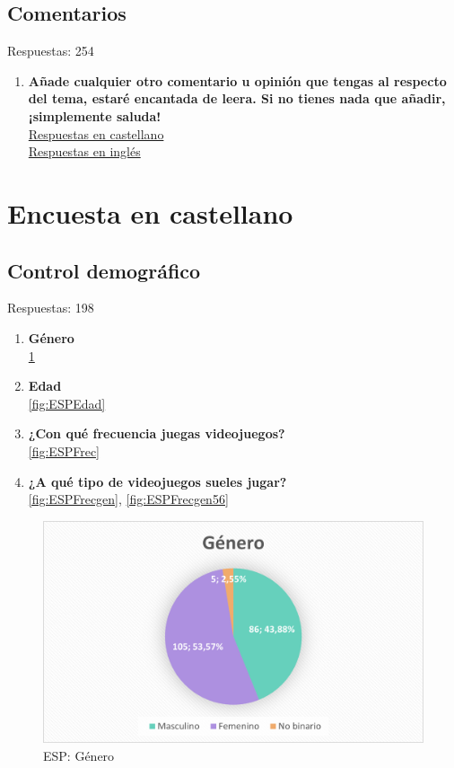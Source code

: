 \documentclass[12pt, a4paper,twoside,titlepage]{book}
\begin{document}
\subsection{Comentarios}
Respuestas: 254
\begin{enumerate}[label=\textbf{\arabic*}.]
     \item \textbf{Añade cualquier otro comentario u opinión que tengas al respecto del tema, estaré encantada de leera. Si no tienes nada que añadir, ¡simplemente saluda!}\\
     \hyperref[comentariosCastellano]{Respuestas en castellano}\\
     \hyperref[comentariosIngles]{Respuestas en inglés}
\end{enumerate}




\newpage
\section{Encuesta en castellano}



\subsection{Control demográfico}
Respuestas: 198
\begin{enumerate}[label=\textbf{\arabic*}.]
     \item \textbf{Género}\\
     \ref{fig:ESPGen}
     \item \textbf{Edad }\\
     \ref{fig:ESPEdad}
     \item \textbf{¿Con qué frecuencia juegas videojuegos?}\\
     \ref{fig:ESPFrec}
     \item \textbf{¿A qué tipo de videojuegos sueles jugar? }\\
     \ref{fig:ESPFrecgen}, \ref{fig:ESPFrecgen56}
\end{enumerate}


\begin{figure}
    \centering
    \includegraphics[width=.8\linewidth]{ANEXO ESP/1AnexESPGen}
    \caption{ESP: Género}
    \label{fig:ESPGen}
\end{figure}
\end{document}
